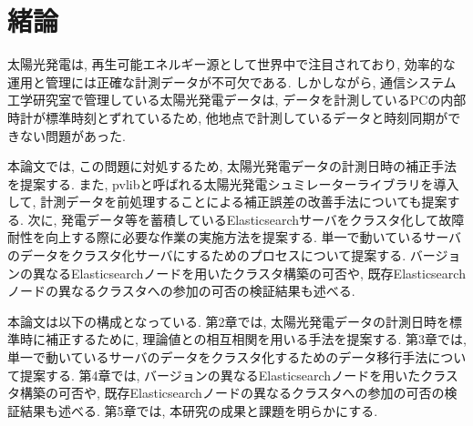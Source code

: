 \chapter{緒論}
\label{chap:first}

太陽光発電は, 再生可能エネルギー源として世界中で注目されており, 効率的な運用と管理には正確な計測データが不可欠である. しかしながら, 通信システム工学研究室で管理している太陽光発電データは, データを計測しているPCの内部時計が標準時刻とずれているため, 他地点で計測しているデータと時刻同期ができない問題があった.

本論文では, この問題に対処するため, 太陽光発電データの計測日時の補正手法を提案する. また, pvlibと呼ばれる太陽光発電シュミレーターライブラリを導入して, 計測データを前処理することによる補正誤差の改善手法についても提案する.
次に, 発電データ等を蓄積しているElasticsearchサーバをクラスタ化して故障耐性を向上する際に必要な作業の実施方法を提案する. 単一で動いているサーバのデータをクラスタ化サーバにするためのプロセスについて提案する. バージョンの異なるElasticsearchノードを用いたクラスタ構築の可否や, 既存Elasticsearchノードの異なるクラスタへの参加の可否の検証結果も述べる. 

本論文は以下の構成となっている. 第2章では, 太陽光発電データの計測日時を標準時に補正するために, 理論値との相互相関を用いる手法を提案する. 第3章では, 単一で動いているサーバのデータをクラスタ化するためのデータ移行手法について提案する. 第4章では, バージョンの異なるElasticsearchノードを用いたクラスタ構築の可否や, 既存Elasticsearchノードの異なるクラスタへの参加の可否の検証結果も述べる. 第5章では, 本研究の成果と課題を明らかにする.